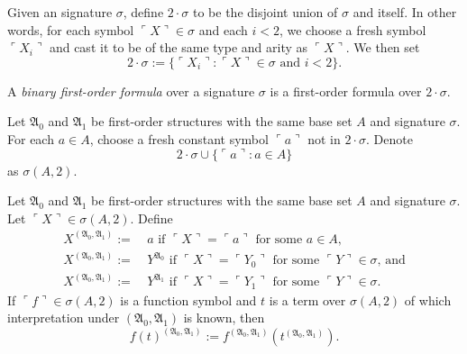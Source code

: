 \documentclass[12pt]{article}
\numberwithin{equation}{section}
\begin{document}
\begin{defi}
Given an signature $\sigma$, define $2 \cdot \sigma$ to be the disjoint union of $\sigma$ and itself. In other words, for each symbol $\ulcorner X \urcorner \in \sigma$ and each $i < 2$, we choose a fresh symbol $\ulcorner X_{i} \urcorner$ and cast it to be of the same type and arity as $\ulcorner X \urcorner$. We then set
\begin{equation*}
    2 \cdot \sigma := \{\ulcorner X_{i} \urcorner : \ulcorner X \urcorner \in \sigma \text{ and } i < 2\} \text{.}
\end{equation*}
\end{defi}

\begin{defi}
A \emph{binary first-order formula} over a signature $\sigma$ is a first-order formula over $2 \cdot \sigma$.
\end{defi}

\begin{defi}
Let $\mathfrak{A}_0$ and $\mathfrak{A}_1$ be first-order structures with the same base set $A$ and signature $\sigma$. For each $a \in A$, choose a fresh constant symbol $\ulcorner a \urcorner$ not in $2 \cdot \sigma$. Denote
\begin{equation*}
    2 \cdot \sigma \cup \{\ulcorner a \urcorner : a \in A\}
\end{equation*}
as $\sigma(A, 2)$.
\end{defi}

\begin{defi}
Let $\mathfrak{A}_0$ and $\mathfrak{A}_1$ be first-order structures with the same base set $A$ and signature $\sigma$. Let $\ulcorner X \urcorner \in \sigma(A, 2)$.
Define
\begin{align*}
    X^{(\mathfrak{A}_0, \mathfrak{A}_1)} := \ & a \text{ if } \ulcorner X \urcorner = \ulcorner a \urcorner \text{ for some } a \in A \text{,} \\
    X^{(\mathfrak{A}_0, \mathfrak{A}_1)} := \ & Y^{\mathfrak{A}_0} \text{ if } \ulcorner X \urcorner = \ulcorner Y_0 \urcorner \text{ for some } \ulcorner Y \urcorner \in \sigma \text{, and} \\
    X^{(\mathfrak{A}_0, \mathfrak{A}_1)} := \ & Y^{\mathfrak{A}_1} \text{ if } \ulcorner X \urcorner = \ulcorner Y_1 \urcorner \text{ for some } \ulcorner Y \urcorner \in \sigma \text{.}
\end{align*}
If $\ulcorner f \urcorner \in \sigma(A, 2)$ is a function symbol and $t$ is a term over $\sigma(A, 2)$ of which interpretation under $(\mathfrak{A}_0, \mathfrak{A}_1)$ is known, then 
\begin{equation*}
    f(t)^{(\mathfrak{A}_0, \mathfrak{A}_1)} := f^{(\mathfrak{A}_0, \mathfrak{A}_1)}(t^{(\mathfrak{A}_0, \mathfrak{A}_1)}) \text{.}
\end{equation*}
\end{defi}
\end{document}
